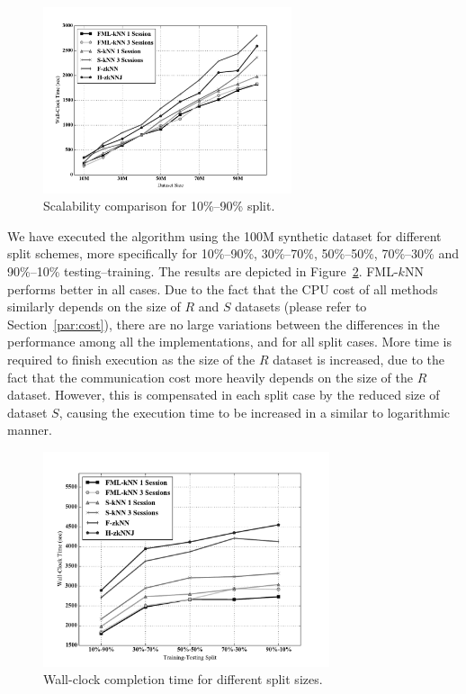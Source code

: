 \begin{figure}[!ht]
	\centering
	\includegraphics[width=0.65\textwidth]{figures/figure6.pdf}
	\caption{Scalability comparison for 10\%--90\% split.}
	\label{figure6}
\end{figure}

We have executed the algorithm using the 100M synthetic dataset for different split schemes, more specifically for 10\%--90\%,  30\%--70\%, 50\%--50\%, 70\%--30\% and 90\%--10\% testing--training. The results are depicted in Figure~\ref{figure7}. FML-$k$NN performs better in all cases. Due to the fact that the CPU cost of all methods similarly depends on the size of $R$ and $S$ datasets (please refer to Section~\ref{par:cost}), there are no large variations between the differences in the performance among all the implementations, and for all split cases. More time is required to finish execution as the size of the $R$ dataset is increased, due to the fact that the communication cost more heavily depends on the size of the $R$ dataset. However, this is compensated in each split case by the reduced size of dataset $S$, causing the execution time to be increased in a similar to logarithmic manner.

\begin{figure}[!ht]
	\centering
	\includegraphics[width=0.75\textwidth]{figures/figure7.pdf}
	\caption{Wall-clock completion time for different split sizes.}
	\label{figure7}
\end{figure}

